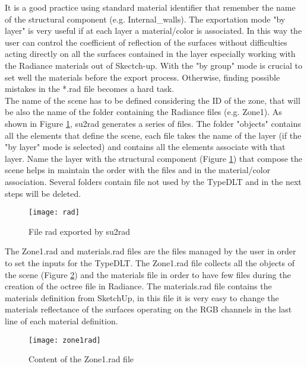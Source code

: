 It is a good practice using standard material identifier that remember the name of the structural component (e.g. Internal\_walls). The exportation mode "by layer" is very useful if  at each layer a material/color is associated. In this way the user can control the coefficient of reflection of the surfaces without difficulties acting directly on all the surfaces contained in the layer especially working with the Radiance materials out of Skectch-up. With the "by group" mode is crucial to set well the materials before the export process. Otherwise, finding possible mistakes in the *.rad file becomes a hard task.\\
The name of the scene has to be defined considering the ID of the zone, that will be also the name of the folder containing the Radiance files (e.g. Zone1). As shown in Figure \ref{img2:rad}, su2rad generates a series of files. The folder "objects" contains all the elements that define the scene, each file takes the name of the layer (if the "by layer" mode is selected) and contains all the elements associate with that layer. Name the layer with the structural component (Figure \ref{img2:rad}) that compose the scene helps in maintain the order with the files and in the material/color association. Several folders contain file not used by the TypeDLT and in the next steps will be deleted.

\begin{figure}[h]
\centering
\texttt{[image: rad]}
\caption{\label{img2:rad} File rad exported by su2rad}
\end{figure}

The Zone1.rad and materials.rad files are the files managed by the user in order to set the inputs for the TypeDLT. The Zone1.rad file collects all the objects of the scene (Figure \ref{img2:zone1rad}) and the materials file in order to have few files during the creation of the octree file in Radiance. The materials.rad file contains the materials definition from SketchUp, in this file it is very easy to change the materials reflectance of the surfaces operating on the RGB channels in the last line of each material definition.

\begin{figure}[h]
\centering
\texttt{[image: zone1rad]}
\caption{\label{img2:zone1rad} Content of the Zone1.rad file}
\end{figure}

